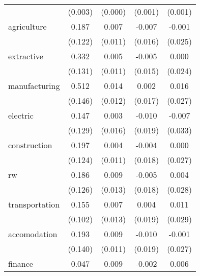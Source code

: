 {\begin{tabular}{l*{4}{c}}
            &     (0.003)         &     (0.000)         &     (0.001)         &     (0.001)         \\
[1em]
agriculture &       0.187         &       0.007         &      -0.007         &      -0.001         \\
            &     (0.122)         &     (0.011)         &     (0.016)         &     (0.025)         \\
[1em]
extractive  &       0.332\sym{**} &       0.005         &      -0.005         &       0.000         \\
            &     (0.131)         &     (0.011)         &     (0.015)         &     (0.024)         \\
[1em]
manufacturing&       0.512\sym{***}&       0.014         &       0.002         &       0.016         \\
            &     (0.146)         &     (0.012)         &     (0.017)         &     (0.027)         \\
[1em]
electric    &       0.147         &       0.003         &      -0.010         &      -0.007         \\
            &     (0.129)         &     (0.016)         &     (0.019)         &     (0.033)         \\
[1em]
construction&       0.197         &       0.004         &      -0.004         &       0.000         \\
            &     (0.124)         &     (0.011)         &     (0.018)         &     (0.027)         \\
[1em]
rw          &       0.186         &       0.009         &      -0.005         &       0.004         \\
            &     (0.126)         &     (0.013)         &     (0.018)         &     (0.028)         \\
[1em]
transportation&       0.155         &       0.007         &       0.004         &       0.011         \\
            &     (0.102)         &     (0.013)         &     (0.019)         &     (0.029)         \\
[1em]
accomodation&       0.193         &       0.009         &      -0.010         &      -0.001         \\
            &     (0.140)         &     (0.011)         &     (0.019)         &     (0.027)         \\
[1em]
finance     &       0.047         &       0.009         &      -0.002         &       0.006         \\

\end{tabular}}
